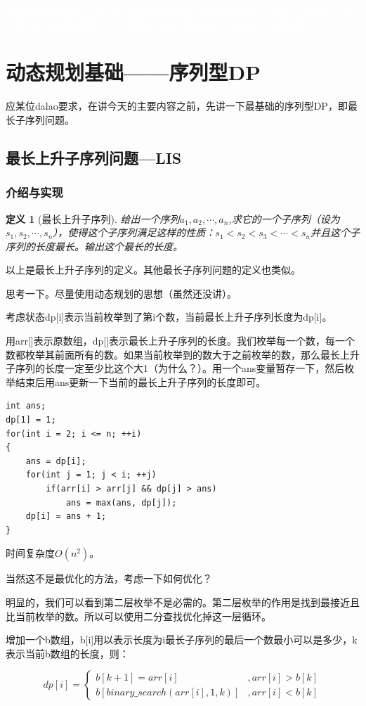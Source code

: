 \documentclass{article}
\newtheorem{definition}{定义}[subsection]
\theoremstyle{nonumberplain}
\begin{document}
\textcolor{white}{希望大家不要放弃，OIer这个群体很是特殊，并且饱受排挤，大家一定坚持下去，不管外界怎么看待我们，一定要记住自己的目标。不忘初心，方得始终。}
\newpage
\section{动态规划基础------序列型DP}
应某位dalao要求，在讲今天的主要内容之前，先讲一下最基础的序列型DP，即最长子序列问题。
\subsection{最长上升子序列问题---LIS}
\subsubsection{介绍与实现}
\begin{definition}[最长上升子序列]
	给出一个序列$a_1, a_2, \cdots, a_n$,求它的一个子序列（设为$s_1, s_2, \cdots, s_n$），使得这个子序列满足这样的性质：$s_1<s_2<s_3<\cdots<s_n$并且这个子序列的长度最长。输出这个最长的长度。
\end{definition}

以上是最长上升子序列的定义。其他最长子序列问题的定义也类似。

思考一下。尽量使用动态规划的思想（虽然还没讲）。

考虑状态dp[i]表示当前枚举到了第i个数，当前最长上升子序列长度为dp[i]。

用arr[]表示原数组，dp[]表示最长上升子序列的长度。我们枚举每一个数，每一个数都枚举其前面所有的数。如果当前枚举到的数大于之前枚举的数，那么最长上升子序列的长度一定至少比这个大1（为什么？）。用一个ans变量暂存一下，然后枚举结束后用ans更新一下当前的最长上升子序列的长度即可。
\begin{verbatim}
int ans;  
dp[1] = 1;  
for(int i = 2; i <= n; ++i)  
{
    ans = dp[i];  
    for(int j = 1; j < i; ++j)
        if(arr[i] > arr[j] && dp[j] > ans)  
            ans = max(ans, dp[j]);  
    dp[i] = ans + 1;
}
\end{verbatim}

时间复杂度$O(n^2)$。

当然这不是最优化的方法，考虑一下如何优化？

明显的，我们可以看到第二层枚举不是必需的。第二层枚举的作用是找到最接近且比当前枚举的数。所以可以使用二分查找优化掉这一层循环。

增加一个b数组，b[i]用以表示长度为i最长子序列的最后一个数最小可以是多少，k表示当前b数组的长度，则：

\begin{equation*}
	dp[i]=\begin{cases}
		b[k+1]=arr[i]                  & , arr[i]>b[k] \\
		b[binary\_search(arr[i],1,k)] & , arr[i]<b[k]
	\end{cases}
\end{equation*}
\end{document}
